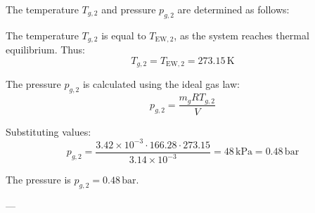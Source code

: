 The temperature \( T_{g,2} \) and pressure \( p_{g,2} \) are determined as follows:  

The temperature \( T_{g,2} \) is equal to \( T_{\text{EW},2} \), as the system reaches thermal equilibrium. Thus:  
\[
T_{g,2} = T_{\text{EW},2} = 273.15 \, \text{K}
\]  

The pressure \( p_{g,2} \) is calculated using the ideal gas law:  
\[
p_{g,2} = \frac{m_g R T_{g,2}}{V}
\]  

Substituting values:  
\[
p_{g,2} = \frac{3.42 \times 10^{-3} \cdot 166.28 \cdot 273.15}{3.14 \times 10^{-3}} = 48 \, \text{kPa} = 0.48 \, \text{bar}
\]  

The pressure is \( p_{g,2} = 0.48 \, \text{bar} \).  

---